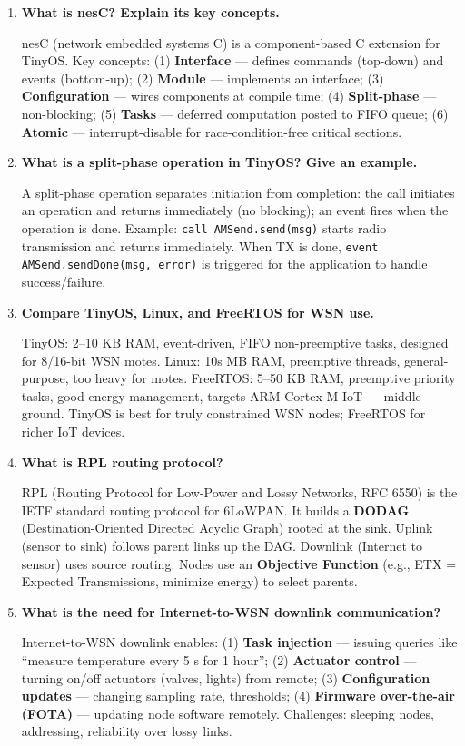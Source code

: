 \documentclass[12pt,a4paper]{article}
\newcommand{\Q}[1]{\textbf{#1}\par\noindent\ignorespaces}
\begin{document}
\begin{tcolorbox}[exambox, title={\textbf{Frequently Asked / Viva Questions}}]
\begin{enumerate}[topsep=0pt, label=\textbf{Q\arabic*.}, itemsep=5pt]
  \item \Q{What is nesC? Explain its key concepts.}
  nesC (network embedded systems C) is a component-based C extension for TinyOS. Key concepts: (1) \textbf{Interface} --- defines commands (top-down) and events (bottom-up); (2) \textbf{Module} --- implements an interface; (3) \textbf{Configuration} --- wires components at compile time; (4) \textbf{Split-phase} --- non-blocking; (5) \textbf{Tasks} --- deferred computation posted to FIFO queue; (6) \textbf{Atomic} --- interrupt-disable for race-condition-free critical sections.

  \item \Q{What is a split-phase operation in TinyOS? Give an example.}
  A split-phase operation separates initiation from completion: the call initiates an operation and returns immediately (no blocking); an event fires when the operation is done. Example: \texttt{call AMSend.send(msg)} starts radio transmission and returns immediately. When TX is done, \texttt{event AMSend.sendDone(msg, error)} is triggered for the application to handle success/failure.

  \item \Q{Compare TinyOS, Linux, and FreeRTOS for WSN use.}
  TinyOS: 2--10 KB RAM, event-driven, FIFO non-preemptive tasks, designed for 8/16-bit WSN motes. Linux: 10s MB RAM, preemptive threads, general-purpose, too heavy for motes. FreeRTOS: 5--50 KB RAM, preemptive priority tasks, good energy management, targets ARM Cortex-M IoT --- middle ground. TinyOS is best for truly constrained WSN nodes; FreeRTOS for richer IoT devices.

  \item \Q{What is RPL routing protocol?}
  RPL (Routing Protocol for Low-Power and Lossy Networks, RFC 6550) is the IETF standard routing protocol for 6LoWPAN. It builds a \textbf{DODAG} (Destination-Oriented Directed Acyclic Graph) rooted at the sink. Uplink (sensor to sink) follows parent links up the DAG. Downlink (Internet to sensor) uses source routing. Nodes use an \textbf{Objective Function} (e.g., ETX = Expected Transmissions, minimize energy) to select parents.

  \item \Q{What is the need for Internet-to-WSN downlink communication?}
  Internet-to-WSN downlink enables: (1) \textbf{Task injection} --- issuing queries like ``measure temperature every 5 s for 1 hour''; (2) \textbf{Actuator control} --- turning on/off actuators (valves, lights) from remote; (3) \textbf{Configuration updates} --- changing sampling rate, thresholds; (4) \textbf{Firmware over-the-air (FOTA)} --- updating node software remotely. Challenges: sleeping nodes, addressing, reliability over lossy links.


\end{enumerate}
\end{tcolorbox}
\end{document}
